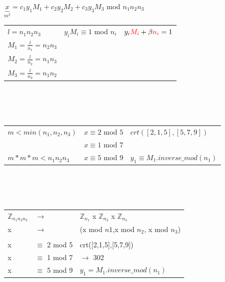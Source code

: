\documentclass[10pt]{article}
\newcommand{\ZN}{\mathbb{Z}} %
\begin{document}
$\underbrace{x}_{m^3} = c_1 y_1 M_1 + c_2 y_2 M_2 + c_3 y_3 M_3$ mod $n_1n_2n_3$ \\ 

\begin{tabular}{p{5cm}  p{5cm} l }
	$l=n_1n_2n_3$ & $y_iM_i\equiv 1$ mod $n_i$ & $y_i{\color{red}M_i} + \beta {\color{red}n_i}=1$\\
	$M_1 = \frac{l}{n_1} = n_2n_3$ \\
	$M_2 = \frac{l}{n_2} = n_1n_3$ \\
	$M_3 = \frac{l}{n_3} = n_1n_2$ \\
\end{tabular} \\ \\
\\
\begin{tabular}{p{5cm}  p{5cm} l }
	$m < min(n_1,n_2,n_3)$ & $x\equiv2$ mod $5$ & $crt([2,1,5],[5,7,9])$ \\
	& $x\equiv1$ mod $7$ \\
	$m*m*m < n_1n_2n_3$ & $x\equiv5$ mod $9$ & $y_1\equiv M_1.inverse\_mod(n_1)$ \\
\end{tabular} \\ \\
\\
\begin{tabular}{l l l}
	$\ZN_{n_1n_2n_3}$ & $\rightarrow$ & $\ZN_{n_1}$ x $\ZN_{n_2}$ x $\ZN_{n_3}$ \\
	x & $\rightarrow$ & (x mod $n1$,x mod $n_2$, x mod $n_3$) \\
	\\
	x & $\equiv$ 2 mod 5 & crt([2,1,5],[5,7,9]) \\
	x & $\equiv$ 1 mod 7 & $\rightarrow$ 302 \\
	x & $\equiv$ 5 mod 9 & $y_1 = M_1.inverse\_mod(n_1)$
\end{tabular}
\end{document}
